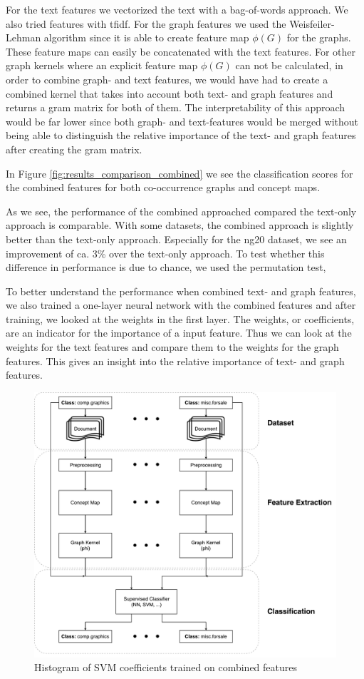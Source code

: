 For the text features we vectorized the text with a bag-of-words approach. We also tried features with tfidf.
For the graph features we used the Weisfeiler-Lehman algorithm since it is able to create feature map $\phi(G)$ for the graphs.
These feature maps can easily be concatenated with the text features.
For other graph kernels where an explicit feature map $\phi(G)$ can not be calculated, in order to combine graph- and text features, we would have had to create a combined kernel that takes into account both text- and graph features and returns a gram matrix for both of them.
The interpretability of this approach would be far lower since both graph- and text-features would be merged without being able to distinguish the relative importance of the text- and graph features after creating the gram matrix.

In Figure \ref{fig:results_comparison_combined} we see the classification scores for the combined features for both co-occurrence graphs and concept maps.

As we see, the performance of the combined approached compared the text-only approach is comparable.
With some datasets, the combined approach is slightly better than the text-only approach. Especially for the ng20 dataset, we see an improvement of ca. 3\% over the text-only approach.
To test whether this difference in performance is due to chance, we used the permutation test, 

To better understand the performance when combined text- and graph features, we also trained a one-layer neural network with the combined features and after training, we looked at the weights in the first layer.
The weights, or coefficients, are an indicator for the importance of a input feature.
Thus we can look at the weights for the text features and compare them to the weights for the graph features.
This gives an insight into the relative importance of text- and graph features.



\begin{figure}[ht]
\centering\includegraphics[width=0.6\linewidth]{assets/figures/approach.pdf}
\caption{Histogram of SVM coefficients trained on combined features}
\end{figure}

